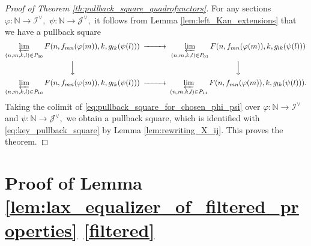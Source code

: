 \documentclass[11pt,leqno]{amsart}
\numberwithin{equation}{section}
\def\N{\mathbb{N}}
\newcommand{\prolim}[1][]{\mathop{\varprojlim}\limits_{#1}}
\newcommand{\cJ}{{\mathcal J}}
\newcommand{\cI}{{\mathcal I}}
\begin{document}
\begin{proof}[Proof of Theorem \ref{th:pullback_square_quadrofunctors}]
For any sections $\varphi:\N\to\cI^{\vee},$ $\psi:\N\to\cJ^{\vee},$ it follows from Lemma \ref{lem:left_Kan_extensions} that we have a pullback square
\begin{equation}\label{eq:pullback_square_for_chosen_phi_psi}
\begin{CD}
	\prolim[(n,m,k,l)\in P_{00}]F(n,f_{mn}(\varphi(m)),k,g_{lk}(\psi(l))) @>>> \prolim[(n,m,k,l)\in P_{01}]F(n,f_{mn}(\varphi(m)),k,g_{lk}(\psi(l)))\\
	@VVV @VVV\\
	\prolim[(n,m,k,l)\in P_{10}]F(n,f_{mn}(\varphi(m)),k,g_{lk}(\psi(l))) @>>> \prolim[(n,m,k,l)\in P_{11}]F(n,f_{mn}(\varphi(m)),k,g_{lk}(\psi(l))).
\end{CD}
\end{equation}
Taking the colimit of \eqref{eq:pullback_square_for_chosen_phi_psi} over $\varphi:\N\to \cI^{\vee}$ and $\psi:\N\to\cJ^{\vee},$ we obtain a pullback square, which is identified with \eqref{eq:key_pullback_square} by Lemma \ref{lem:rewriting_X_ij}. This proves the theorem.
\end{proof}

\section{Proof of Lemma \ref{lem:lax_equalizer_of_filtered_properties} \ref{filtered}}
\label{app:proof_of_lemma_on_filtered}
\end{document}
